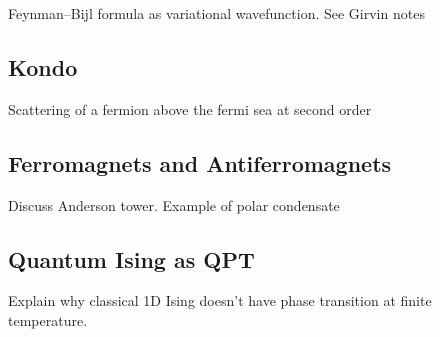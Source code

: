 Feynman--Bijl formula as variational wavefunction. See Girvin notes

\subsection{Kondo}

Scattering of a fermion above the fermi sea at second order

\subsection{Ferromagnets and Antiferromagnets}

Discuss Anderson tower. Example of polar condensate

\subsection{Quantum Ising as QPT}

Explain why classical 1D Ising doesn't have phase transition at finite temperature.